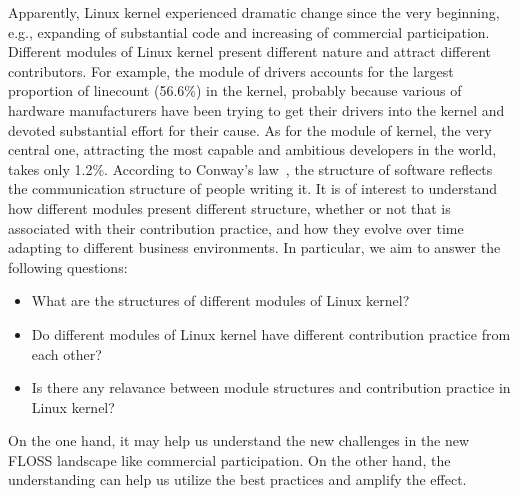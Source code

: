 \documentclass{sig-alternate-05-2015}
\begin{document}
Apparently, Linux kernel experienced dramatic change since the very
beginning, e.g., expanding of substantial code and increasing of commercial participation.
Different modules of Linux kernel present different nature
and attract different contributors. For example, the module of drivers
accounts for the largest proportion of linecount (56.6\%) in the kernel, 
probably because various of 
hardware manufacturers have been trying to get their drivers into the kernel
and devoted substantial effort for their cause.
 As for the module of kernel, the very central one, attracting the most
capable and ambitious developers in the world, takes only 1.2\%.
According to Conway's law~\cite{conway}, the structure of software reflects 
the communication structure of people writing it.
It is of interest to understand how different modules present different
structure, whether or not that is associated with their contribution practice,
and how they evolve over time adapting to different business environments. 
In particular, we aim to answer the following questions:
\begin{itemize}
\item What are the structures of different modules of Linux kernel?
\item Do different modules of Linux kernel have different contribution practice from each other?
\item Is there any relavance between module structures and contribution practice in Linux kernel?

\end{itemize}
On the one hand,
it may help us understand the new challenges in the new FLOSS landscape like
commercial participation.
On the other hand, the understanding can help us
utilize the best practices and amplify the effect. 

\end{document}
